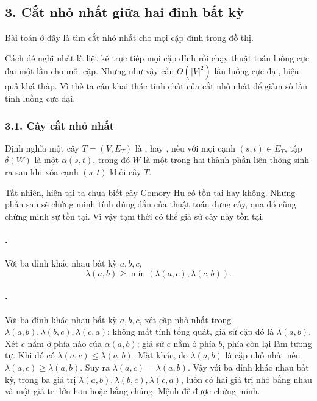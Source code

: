 \documentclass[11pt]{article}
\begin{document}
\subsection*{3. Cắt nhỏ nhất giữa hai đỉnh bất kỳ}

Bài toán ở đây là tìm cắt nhỏ nhất cho mọi cặp đỉnh trong đồ thị.

Cách dễ nghĩ nhất là liệt kê trực tiếp mọi cặp đỉnh rồi chạy thuật toán luồng
cực đại một lần cho mỗi cặp. Nhưng như vậy cần \(\Theta(|V|^2)\) lần luồng
cực đại, hiệu quả khá thấp. Vì thế ta cần khai thác tính chất của cắt nhỏ
nhất để giảm số lần tính luồng cực đại.

\subsubsection*{3.1. Cây cắt nhỏ nhất}

Định nghĩa một cây \(T=(V,E_T)\) là , hay , nếu với mọi cạnh \((s,t)\in E_T\), tập \(\delta(W)\) là một
\(\alpha(s,t)\), trong đó \(W\) là một trong hai thành phần liên thông sinh ra
sau khi xóa cạnh \((s,t)\) khỏi cây \(T\).

Tất nhiên, hiện tại ta chưa biết cây Gomory-Hu có tồn tại hay không. Nhưng
phần sau sẽ chứng minh tính đúng đắn của thuật toán dựng cây, qua đó cũng
chứng minh sự tồn tại. Vì vậy tạm thời có thể giả sử cây này tồn tại.

\paragraph{.}
Với ba đỉnh khác nhau bất kỳ \(a,b,c\),
\[
  \lambda(a,b)\ge \min(\lambda(a,c),\lambda(c,b)).
\]

\paragraph{.}
Với ba đỉnh khác nhau bất kỳ \(a,b,c\), xét cặp nhỏ nhất trong
\(\lambda(a,b),\lambda(b,c),\lambda(c,a)\); không mất tính tổng quát, giả sử
cặp đó là \(\lambda(a,b)\). Xét \(c\) nằm ở phía nào của
\(\alpha(a,b)\); giả sử \(c\) nằm ở phía \(b\), phía còn lại làm tương tự.
Khi đó có \(\lambda(a,c)\le \lambda(a,b)\). Mặt khác, do \(\lambda(a,b)\) là
cặp nhỏ nhất nên \(\lambda(a,c)\ge \lambda(a,b)\). Suy ra
\(\lambda(a,c)=\lambda(a,b)\). Vậy với ba đỉnh khác nhau bất kỳ, trong ba giá
trị \(\lambda(a,b),\lambda(b,c),\lambda(c,a)\), luôn có hai giá trị nhỏ bằng
nhau và một giá trị lớn hơn hoặc bằng chúng. Mệnh đề được chứng minh.
\end{document}
